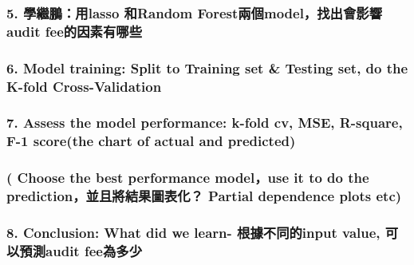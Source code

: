 \documentclass[
]{article}
\begin{document}
\hypertarget{ux5b78ux7e7cux9d6cux7528lasso-ux548crandom-forestux5169ux500bmodelux627eux51faux6703ux5f71ux97ffaudit-feeux7684ux56e0ux7d20ux6709ux54eaux4e9b}{%
\subsubsection{5. 學繼鵬：用lasso 和Random
Forest兩個model，找出會影響audit
fee的因素有哪些}\label{ux5b78ux7e7cux9d6cux7528lasso-ux548crandom-forestux5169ux500bmodelux627eux51faux6703ux5f71ux97ffaudit-feeux7684ux56e0ux7d20ux6709ux54eaux4e9b}}

\hypertarget{model-training-split-to-training-set-testing-set-do-the-k-fold-cross-validation}{%
\subsubsection{6. Model training: Split to Training set \& Testing set,
do the K-fold
Cross-Validation}\label{model-training-split-to-training-set-testing-set-do-the-k-fold-cross-validation}}

\hypertarget{assess-the-model-performance-k-fold-cv-mse-r-square-f-1-scorethe-chart-of-actual-and-predicted}{%
\subsubsection{7. Assess the model performance: k-fold cv, MSE,
R-square, F-1 score(the chart of actual and
predicted)}\label{assess-the-model-performance-k-fold-cv-mse-r-square-f-1-scorethe-chart-of-actual-and-predicted}}

\hypertarget{choose-the-best-performance-modeluse-it-to-do-the-predictionux4e26ux4e14ux5c07ux7d50ux679cux5716ux8868ux5316-partial-dependence-plots-etc}{%
\subsubsection{( Choose the best performance model，use it to do the
prediction，並且將結果圖表化？ Partial dependence plots
etc)}\label{choose-the-best-performance-modeluse-it-to-do-the-predictionux4e26ux4e14ux5c07ux7d50ux679cux5716ux8868ux5316-partial-dependence-plots-etc}}

\hypertarget{conclusion-what-did-we-learn--ux6839ux64daux4e0dux540cux7684input-value-ux53efux4ee5ux9810ux6e2caudit-feeux70baux591aux5c11}{%
\subsubsection{8. Conclusion: What did we learn- 根據不同的input value,
可以預測audit
fee為多少}\label{conclusion-what-did-we-learn--ux6839ux64daux4e0dux540cux7684input-value-ux53efux4ee5ux9810ux6e2caudit-feeux70baux591aux5c11}}
\end{document}
